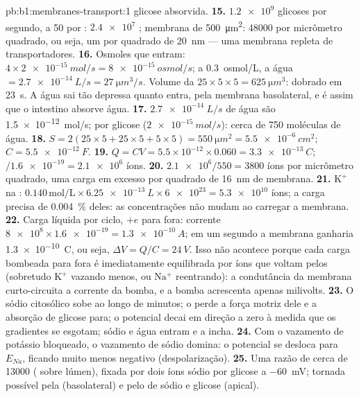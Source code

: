 \begin{solution}{pb:b1:membranes-transport:1}
glicose absorvida.
\textbf{15.} $\num{1.2e9}$ glicoses por segundo, a 50 por :
$\num{2.4e7}$ ; membrana de \qty{500}{\micro m^2}:
\num{48000} por micrômetro quadrado, ou seja, um por quadrado de
\qty{20}{nm} --- uma membrana repleta de transportadores.
\textbf{16.} Osmoles que entram: $4\times\qty{2e-15}{mol/s} =
\qty{8e-15}{osmol/s}$; a \qty{0.3}{osmol/L}, a água
$= \qty{2.7e-14}{L/s} = \qty{27}{\micro m^3/s}$. Volume da 
$25\times 5\times 5 = \qty{625}{\micro m^3}$: dobrado em \qty{23}{s}. A
água sai tão depressa quanto entra, pela membrana basolateral, e é assim
que o intestino absorve água.
\textbf{17.} $\qty{2.7e-14}{L/s}$ de água são \qty{1.5e-12}{mol/s}; por glicose ($\qty{2e-15}{mol/s}$): cerca de 750 moléculas de água.
\textbf{18.} $S = 2(25\times 5 + 25\times 5 + 5\times 5) =
\qty{550}{\micro m^2} = \qty{5.5e-6}{cm^2}$; $C = \qty{5.5e-12}{F}$.
\textbf{19.} $Q = CV = 5.5\times 10^{-12}\times 0.060 =
\qty{3.3e-13}{C}$; $/\num{1.6e-19} = \num{2.1e6}$ íons.
\textbf{20.} $\num{2.1e6}/550 = 3800$ íons por micrômetro quadrado, uma carga em excesso por quadrado de \qty{16}{nm} de membrana.
\textbf{21.} $\mathrm{K^+}$ na : $0.140\,\mathrm{mol/L}\times
\qty{6.25e-13}{L}\times\num{6e23} = \num{5.3e10}$ íons; a carga precisa
de \qty{0.004}{\%} deles: as concentrações não mudam ao carregar a
membrana.
\textbf{22.} Carga líquida por ciclo, $+e$ para fora: corrente
$\num{8e8}\times
\num{1.6e-19} = \qty{1.3e-10}{A}$; em um segundo a membrana ganharia
\qty{1.3e-10}{C}, ou seja, $\Delta V = Q/C = \qty{24}{V}$. Isso não
acontece porque cada carga bombeada para fora é imediatamente
equilibrada por íons que voltam pelos  (sobretudo $\mathrm{K^+}$
vazando menos, ou $\mathrm{Na^+}$ reentrando): a condutância da membrana
curto-circuita a corrente da bomba, e a bomba acrescenta apenas
milivolts.
\textbf{23.} O sódio citosólico sobe ao longo de minutos; o 
perde a força motriz dele e a absorção de glicose para; o potencial
decai em direção a zero à medida que os gradientes se esgotam; sódio e
água entram e a  incha.
\textbf{24.} Com o vazamento de potássio bloqueado, o vazamento de sódio
domina: o potencial se desloca para $E_{Na}$, ficando muito menos
negativo (despolarização).
\textbf{25.} Uma razão de cerca de \num{13000} ( sobre lúmen),
fixada por dois íons sódio por glicose a \qty{-60}{mV}; tornada possível
pela  (basolateral) e pelo  de sódio
e glicose (apical).
\end{solution}
